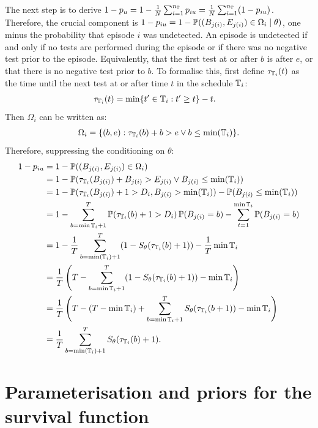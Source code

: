 \documentclass[thesis.tex]{subfiles}
\begin{document}
The next step is to derive $1 - p_u = 1 - \frac{1}{N} \sum_{i=1}^{n_{\mathbb{T}}} p_{iu} = \frac{1}{N} \sum_{i=1}^{n_{\mathbb{T}}} (1 - p_{iu})$.
Therefore, the crucial component is $1 - p_{iu} = 1 - \operatorname{\mathbb{P}}((B_{j(i)}, E_{j(i)}) \in \Omega_i \mid \theta)$, one minus the probability that episode $i$ was undetected.
An episode is undetected if and only if no tests are performed during the episode or if there was no negative test prior to the episode.
Equivalently, that the first test at or after $b$ is after $e$, or that there is no negative test prior to $b$.
To formalise this, first define $\tau_{\mathbb{T}_i}(t)$ as the time until the next test at or after time $t$ in the schedule $\mathbb{T}_i$:
\begin{align}
\tau_{\mathbb{T}_i}(t) &= \min \{ t' \in \mathbb{T}_i : t' \geq t \} - t.
\end{align}
Then $\Omega_i$ can be written as:
\begin{align}
\Omega_i = \{ (b, e) : \tau_{\mathbb{T}_i}(b) + b > e \vee b \leq \min(\mathbb{T}_i) \}.
\end{align}
Therefore, suppressing the conditioning on $\theta$:
\begin{align}
1 - p_{iu}
&= 1 - \operatorname{\mathbb{P}}((B_{j(i)}, E_{j(i)}) \in \Omega_i) \\
&= 1 - \operatorname{\mathbb{P}}( \tau_{\mathbb{T}_i}(B_{j(i)}) + B_{j(i)} > E_{j(i)} \vee B_{j(i)} \leq \min(\mathbb{T}_i) ) \\
&= 1 - \operatorname{\mathbb{P}}( \tau_{\mathbb{T}_i}(B_{j(i)}) + 1 > D_i , B_{j(i)} > \min(\mathbb{T}_i) )  - \operatorname{\mathbb{P}}( B_{j(i)} \leq \min(\mathbb{T}_i) ) \\
&= 1 - \sum_{b={\min\mathbb{T}_i} + 1}^T \operatorname{\mathbb{P}}( \tau_{\mathbb{T}_i}(b) + 1> D_i) \operatorname{\mathbb{P}}(B_{j(i)} = b) - \sum_{t=1}^{\min\mathbb{T}_i} \operatorname{\mathbb{P}}(B_{j(i)} = b)\\
&= 1 - \frac{1}{T} \sum_{b=\min(\mathbb{T}_i)+1}^T (1 - S_\theta(\tau_{\mathbb{T}_i}(b) + 1)) - \frac{1}{T} \min\mathbb{T}_i \\
&= \frac{1}{T} \left(T - \sum_{b=\min\mathbb{T}_i+1}^T (1 - S_\theta(\tau_{\mathbb{T}_i}(b) + 1)) - \min\mathbb{T}_i \right) \\
&= \frac{1}{T} \left(T - (T - \min\mathbb{T}_i) + \sum_{b=\min\mathbb{T}_i+1}^T S_\theta(\tau_{\mathbb{T}_i}(b + 1)) - \min\mathbb{T}_i \right) \\
&= \frac{1}{T} \sum_{b=\min(\mathbb{T}_i)+1}^T S_\theta(\tau_{\mathbb{T}_i}(b) + 1). \label{perf-test:eq:piu}
\end{align}


\section{Parameterisation and priors for the survival function} \label{perf-test:sec:parameters-priors}
\end{document}
